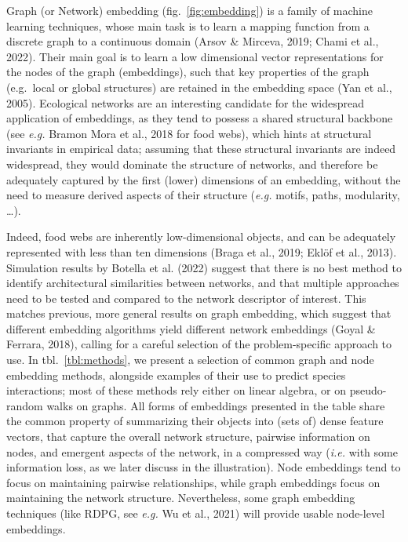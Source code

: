 \documentclass[10pt,oneside]{article}
\begin{document}
Graph (or Network) embedding (fig.~\ref{fig:embedding}) is a family of
machine learning techniques, whose main task is to learn a mapping
function from a discrete graph to a continuous domain (Arsov \& Mirceva,
2019; Chami et al., 2022). Their main goal is to learn a low dimensional
vector representations for the nodes of the graph (embeddings), such
that key properties of the graph (e.g.~local or global structures) are
retained in the embedding space (Yan et al., 2005). Ecological networks
are an interesting candidate for the widespread application of
embeddings, as they tend to possess a shared structural backbone (see
\emph{e.g.} Bramon Mora et al., 2018 for food webs), which hints at
structural invariants in empirical data; assuming that these structural
invariants are indeed widespread, they would dominate the structure of
networks, and therefore be adequately captured by the first (lower)
dimensions of an embedding, without the need to measure derived aspects
of their structure (\emph{e.g.} motifs, paths, modularity, \ldots).

Indeed, food webs are inherently low-dimensional objects, and can be
adequately represented with less than ten dimensions (Braga et al.,
2019; Eklöf et al., 2013). Simulation results by Botella et al. (2022)
suggest that there is no best method to identify architectural
similarities between networks, and that multiple approaches need to be
tested and compared to the network descriptor of interest. This matches
previous, more general results on graph embedding, which suggest that
different embedding algorithms yield different network embeddings (Goyal
\& Ferrara, 2018), calling for a careful selection of the
problem-specific approach to use. In tbl.~\ref{tbl:methods}, we present
a selection of common graph and node embedding methods, alongside
examples of their use to predict species interactions; most of these
methods rely either on linear algebra, or on pseudo-random walks on
graphs. All forms of embeddings presented in the table share the common
property of summarizing their objects into (sets of) dense feature
vectors, that capture the overall network structure, pairwise
information on nodes, and emergent aspects of the network, in a
compressed way (\emph{i.e.} with some information loss, as we later
discuss in the illustration). Node embeddings tend to focus on
maintaining pairwise relationships, while graph embeddings focus on
maintaining the network structure. Nevertheless, some graph embedding
techniques (like RDPG, see \emph{e.g.} Wu et al., 2021) will provide
usable node-level embeddings.
\end{document}
